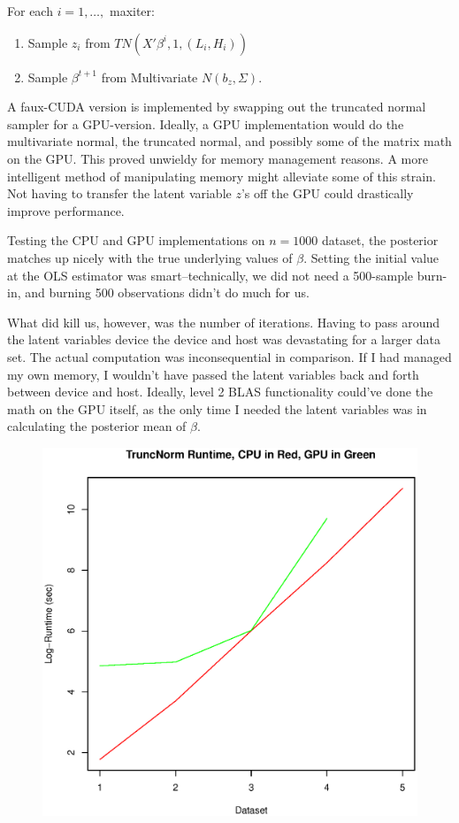 \documentclass[12pt]{article}
\begin{document}
For each $i = 1, \dots,$ maxiter:
\begin{enumerate}
\item Sample $z_i$ from $TN(X' \beta^i, 1, (L_i, H_i))$
\item Sample $\beta^{t+1}$ from Multivariate $N(b_z, \Sigma)$. 
\end{enumerate}

A faux-CUDA version is implemented by swapping out the truncated normal sampler for a GPU-version. Ideally, a GPU implementation would do the multivariate normal, the truncated normal, and possibly some of the matrix math on the GPU. This proved unwieldy for memory management reasons. A more intelligent method of manipulating memory might alleviate some of this strain. Not having to transfer the latent variable $z$'s off the GPU could drastically improve performance.

Testing the CPU and GPU implementations on $n=1000$ dataset, the posterior matches up nicely with the true underlying values of $\beta$. Setting the initial value at the OLS estimator was smart--technically, we did not need a 500-sample burn-in, and burning 500 observations didn't do much for us. 

What did kill us, however, was the number of iterations. Having to pass around the latent variables device the device and host was devastating for a larger data set. The actual computation was inconsequential in comparison. If I had managed my own memory, I wouldn't have passed the latent variables back and forth between device and host. Ideally, level 2 BLAS functionality could've done the math on the GPU itself, as the only time I needed the latent variables was in calculating the posterior mean of $\beta$.

\begin{figure}[H] \center
\includegraphics[scale=.45]{Probit/Probit_Timings}
\end{figure}
\end{document}
